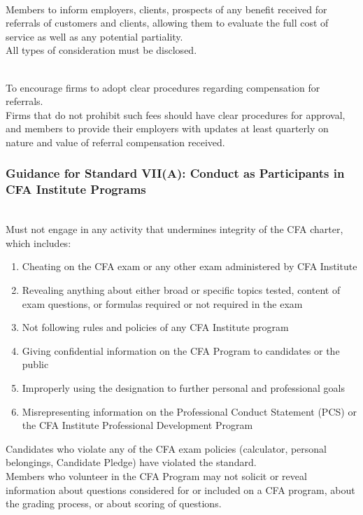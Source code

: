 \begin{remark} \\
Members to inform employers, clients, prospects of any benefit received for referrals of customers and clients, allowing them to evaluate the full cost of service as well as any potential partiality.\\
All types of consideration must be disclosed.
\end{remark}

\begin{remark} \\
To encourage firms to adopt clear procedures regarding compensation for referrals.\\
Firms that do not prohibit such fees should have clear procedures for approval, and members to provide their employers with updates at least quarterly on nature and value of referral compensation received.
\end{remark}

\subsubsection{Guidance for Standard VII(A): Conduct as Participants in CFA Institute Programs}

\begin{remark} \\
Must not engage in any activity that undermines integrity of the CFA charter, which includes:
\begin{enumerate}[label=\roman*.]
\setlength{\itemsep}{0pt}
\item Cheating on the CFA exam or any other exam administered by CFA Institute
\item Revealing anything about either broad or specific topics tested, content of exam questions, or formulas required or not required in the exam
\item Not following rules and policies of any CFA Institute program
\item Giving confidential information on the CFA Program to candidates or the public
\item Improperly using the designation to further personal and professional goals
\item Misrepresenting information on the Professional Conduct Statement (PCS) or the CFA Institute Professional Development Program
\end{enumerate}
Candidates who violate any of the CFA exam policies (calculator, personal belongings, Candidate Pledge) have violated the standard.\\
Members who volunteer in the CFA Program may not solicit or reveal information about questions considered for or included on a CFA program, about the grading process, or about scoring of questions.
\end{remark}

